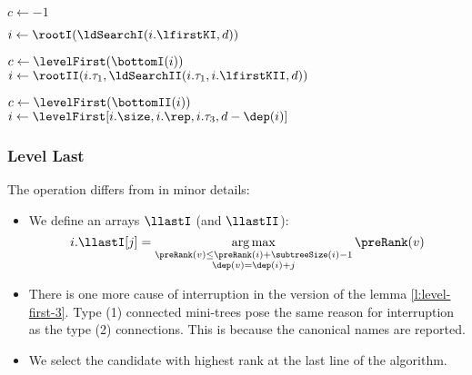 \begin{algorithm}
\begin{algorithmic}
		\State {} 
	\EndIf
	
	\State $c \gets -1$ 

	 
		\State $i \gets \rootI(\ldSearchI(i.\lfirstKI, d))$ 
	\EndIf
	
	 
			\State $c \gets \levelFirst(\bottomI(i))$ 
		\EndIf
		\State $i \gets \rootII(i.\tau_1, \ldSearchII(i.\tau_1, i.\lfirstKII, d))$ 
	\EndIf

		\State $c \gets \levelFirst(\bottomII(i))$ 
	\EndIf
	\State $i \gets \levelFirst[i.\size, i.\rep, i.\tau_3, d - \dep(i)]$ 
	
	\State {}
\EndFunction
\end{algorithmic}
\end{algorithm}

\subsubsection{Level Last}

The operation \levelLast{} differs from \levelFirst{} in minor details:
\begin{itemize}
	\item We define an arrays $\llastI$ (and $\llastII$):
	$$ i.\llastI[j] = \argmax_{\substack{\preRank(v) \le \preRank(i) + \subtreeSize(i) - 1  \\ \dep(v) = \dep(i) + j}} \preRank(v) $$
	\item There is one more cause of interruption in the \levelLast{} version of the lemma \ref{l:level-first-3}.
	Type (1) connected mini-trees pose the same reason for interruption as the type (2) connections.
	This is because the canonical names are reported.
	\item We select the candidate with highest rank at the last line of the algorithm.
\end{itemize}

